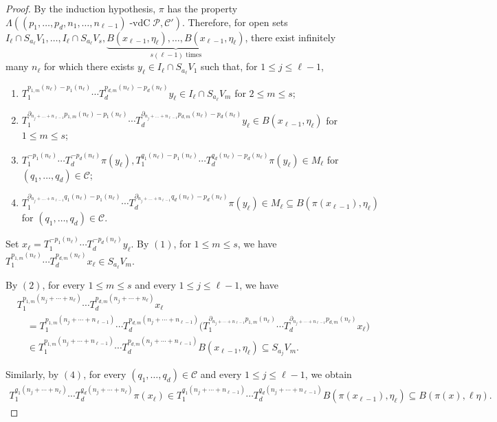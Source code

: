 \documentclass[11pt,reqno]{amsart}
\newcommand{\cC}{{\mathcal C}}
\newcommand{\cP}{{\mathcal P}}
\DeclareMathOperator{\vdc}{-vdC}
\theoremstyle{definition}
\theoremstyle{remark}
\begin{document}
\begin{proof}
By the induction hypothesis, $\pi$ has the property $\Lambda((p_1,\dots,p_d,n_1,\dots,n_{\ell-1})\vdc \cP,\cC')$. Therefore, for open sets $I_{\ell}\cap S_{a_\ell}V_1,\dots,I_{\ell}\cap S_{a_\ell}V_s,\underbrace{B(x_{\ell-1},\eta_{\ell}),\dots, B(x_{\ell-1},\eta_{\ell})}_{s(\ell-1)\text{ times}}$, there exist infinitely many $n_\ell$ for which there exists $y_\ell \in I_{\ell} \cap S_{a_\ell} V_1$ such that, for $1\leq j \leq \ell-1$,\begin{enumerate}
    \item $T_1^{p_{1,m}(n_\ell)-p_1(n_\ell)}\cdots T_d^{p_{d,m}(n_\ell)-p_d(n_\ell)}y_\ell \in I_\ell \cap S_{a_\ell}V_m$ for $2\leq m\leq s$;
    \item $T_1^{\partial_{n_j + \dots+n_{\ell-1}}p_{1,m}(n_{\ell}) - p_1(n_\ell)}\cdots T_d^{\partial_{n_j + \dots+n_{\ell-1}}p_{d,m}(n_{\ell}) - p_d(n_\ell)}y_\ell \in B(x_{\ell-1},\eta_{\ell})$ for $1\leq m \leq s$;
    \item $T_1^{-p_1(n_{\ell})}\cdots T_d^{-p_d(n_{\ell})}\pi(y_\ell),T_1^{q_{1}(n_\ell)-p_1(n_\ell)}\cdots T_d^{q_{d}(n_\ell)-p_d(n_\ell)}\pi(y_\ell)\in M_{\ell}$ for $(q_1,\dots, q_d)\in \cC$;
    \item $T_1^{\partial_{n_{j}+\dots+n_{\ell-1}}q_1(n_\ell) -p_1(n_\ell)}\cdots T_d^{\partial_{n_{j}+\dots+n_{\ell-1}}q_d(n_\ell) -p_d(n_\ell)} \pi(y_\ell)\in M_{\ell} \subseteq B(\pi(x_{\ell-1}),\eta_\ell)$ for $(q_1,\dots,q_d)\in \cC$.
\end{enumerate}

Set $x_{\ell} = T_1^{-p_1(n_{\ell})}\cdots T_d^{-p_d(n_{\ell})}y_{\ell}$. By $(1)$, for $1\leq m\leq s$, we have $T_1^{p_{1,m}(n_\ell)}\cdots T_d^{p_{d,m}(n_\ell)}x_\ell \in S_{a_\ell}V_m$.

By $(2)$, for every $1\leq m\leq s$ and every $1\leq j\leq \ell-1$, we have\begin{align*}
&T_1^{p_{1,m}(n_j+\cdots+n_\ell)}\cdots
 T_d^{p_{d,m}(n_j+\cdots+n_\ell)}x_\ell       \\
&\quad =
T_1^{p_{1,m}(n_j+\cdots+n_{\ell-1})}
\cdots T_d^{p_{d,m}(n_j+\cdots+n_{\ell-1})} 
\Big(
T_1^{\partial_{n_j+\cdots+n_{\ell-1}}p_{1,m}(n_\ell)}\cdots
T_d^{\partial_{n_j+\cdots+n_{\ell-1}}p_{d,m}(n_\ell)}
x_\ell
\Big)                                        \\
&\quad \in
T_1^{p_{1,m}(n_j+\cdots+n_{\ell-1})}\cdots 
T_d^{p_{d,m}(n_j+\cdots+n_{\ell-1})}
B(x_{\ell-1},\eta_\ell)   \subseteq S_{a_j}V_m.
\end{align*}

Similarly, by $(4)$, for every $(q_1,\dots,q_d)\in\cC$ and every $1\leq j\leq \ell-1$, we obtain\begin{align*}
    T_1^{q_1(n_j+\cdots+n_\ell)}\cdots T_d^{q_d(n_j+\cdots+n_\ell)}\pi(x_\ell) \in T_1^{q_1(n_j+\cdots+n_{\ell-1})}\cdots T_d^{q_d(n_j+\cdots+n_{\ell-1})}B(\pi(x_{\ell-1}),\eta_\ell) \subseteq B(\pi(x),\ell\eta).
\end{align*}


\end{proof}
\end{document}

